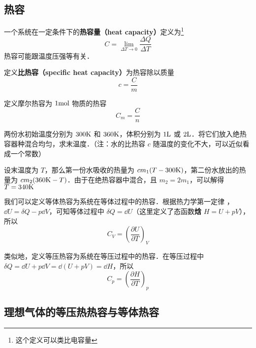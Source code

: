 
\begin{issues}
\issueTODO
\end{issues}
\subsection{热容}
一个系统在一定条件下的\textbf{热容量（heat capacity）}定义为\footnote{这个定义可以类比电容量}
\begin{equation}
C = \lim\limits_{\Delta T\rightarrow 0}\frac{\Delta Q}{\Delta T}
\end{equation}
热容可能跟温度压强等有关．

定义\textbf{比热容（specific heat capacity）}为热容除以质量
\begin{equation}
c = \frac{C}{m}
\end{equation}

定义摩尔热容为 $1 \rm{mol}$ 物质的热容
\begin{equation}
C_m=\frac{C}{n}
\end{equation}

\begin{example}{}
两份水初始温度分别为 $300\rm{K}$ 和 $360\rm{K}$，体积分别为 $1\rm{L}$ 或 $2 \rm{L}$．将它们放入绝热容器种混合均匀，求末温度．（注：水的比热容 $c$ 随温度的变化不大，可以近似看成一个常数）

设末温度为 $T$，那么第一份水吸收的热量为 $c m_1(T-300\rm{K})$，第二份水放出的热量为 $cm_2(360{\rm{K}}-T)$．由于在绝热容器中混合，且 $m_2=2m_1$，可以解得 $T=340\rm{K}$
\end{example}

我们可以定义等体热容为系统在等体过程中的热容．根据热力学第一定律 ，$\dd U=\delta Q-p\dd V$，可知等体过程中 $\delta Q=\dd U$（这里定义了态函数\textbf{焓} $H=U+pV$），所以
\begin{equation}\label{ThCapa_eq1}
C_V=\left(\frac{\partial U}{\partial T}\right)_V
\end{equation}

类似地，定义等压热容为系统在等压过程中的热容．在等压过程中 $\delta Q=\dd U+p\dd V=\dd (U+pV)=\dd H$，所以
\begin{equation}
C_p=\left(\frac{\partial H}{\partial T}\right)_p
\end{equation}

\subsection{理想气体的等压热热容与等体热容}


